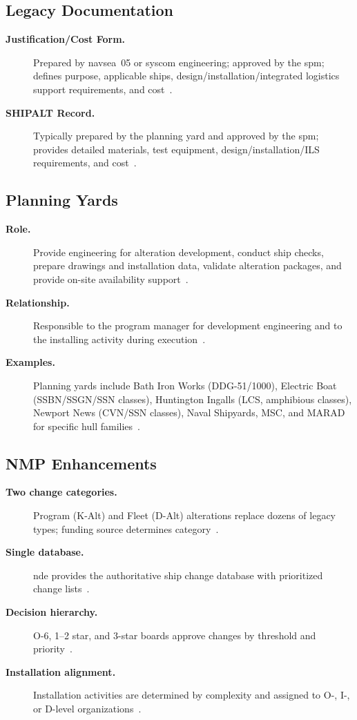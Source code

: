 \documentclass[../main.tex]{subfiles}
\begin{document}
\subsection{Legacy Documentation}
\begin{description}
  \item[\textbf{Justification/Cost Form.}] Prepared by \ac{navsea}~05 or \ac{syscom} engineering; approved by the \ac{spm}; defines purpose, applicable ships, design/installation/integrated logistics support requirements, and cost~\autocite{edo-4-1-2-navy-modernization-2025}.
  \item[\textbf{SHIPALT Record.}] Typically prepared by the planning yard and approved by the \ac{spm}; provides detailed materials, test equipment, design/installation/ILS requirements, and cost~\autocite{edo-4-1-2-navy-modernization-2025}.
\end{description}

\subsection{Planning Yards}
\begin{description}
  \item[\textbf{Role.}] Provide engineering for alteration development, conduct ship checks, prepare drawings and installation data, validate alteration packages, and provide on-site availability support~\autocite{edo-4-1-2-navy-modernization-2025}.
  \item[\textbf{Relationship.}] Responsible to the program manager for development engineering and to the installing activity during execution~\autocite{edo-4-1-2-navy-modernization-2025}.
  \item[\textbf{Examples.}] Planning yards include Bath Iron Works (DDG-51/1000), Electric Boat (SSBN/SSGN/SSN classes), Huntington Ingalls (LCS, amphibious classes), Newport News (CVN/SSN classes), Naval Shipyards, MSC, and MARAD for specific hull families~\autocite{edo-4-1-2-navy-modernization-2025}.
\end{description}

\subsection{NMP Enhancements}
\begin{description}
  \item[\textbf{Two change categories.}] Program (K-Alt) and Fleet (D-Alt) alterations replace dozens of legacy types; funding source determines category~\autocite{edo-4-1-2-navy-modernization-2025}.
  \item[\textbf{Single database.}] \ac{nde} provides the authoritative ship change database with prioritized change lists~\autocite{edo-4-1-2-navy-modernization-2025}.
  \item[\textbf{Decision hierarchy.}] O-6, 1--2 star, and 3-star boards approve changes by threshold and priority~\autocite{edo-4-1-2-navy-modernization-2025}.
  \item[\textbf{Installation alignment.}] Installation activities are determined by complexity and assigned to O-, I-, or D-level organizations~\autocite{edo-4-1-2-navy-modernization-2025}.
\end{description}
\end{document}

